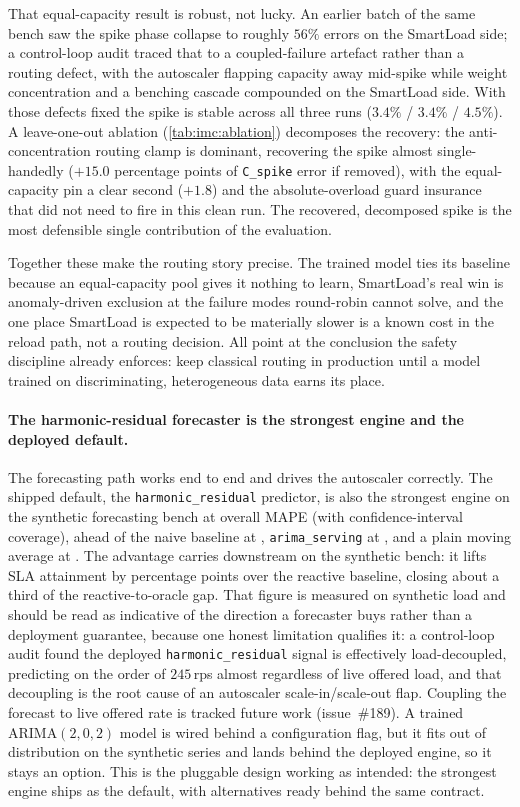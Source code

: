 That equal-capacity result is robust, not lucky. An earlier batch of the same bench saw
the spike phase collapse to roughly $56\%$ errors on the SmartLoad side; a control-loop
audit traced that to a coupled-failure artefact rather than a routing defect, with the
autoscaler flapping capacity away mid-spike while weight concentration and a benching
cascade compounded on the SmartLoad side. With those defects fixed the spike is stable
across all three runs ($3.4\%$ / $3.4\%$ / $4.5\%$). A leave-one-out ablation
(\cref{tab:imc:ablation}) decomposes the recovery: the anti-concentration routing clamp
is dominant, recovering the spike almost single-handedly ($+15.0$ percentage points of
\texttt{C\_spike} error if removed), with the equal-capacity pin a clear second
($+1.8$) and the absolute-overload guard insurance that did not need to fire in this
clean run. The recovered, decomposed spike is the most defensible single contribution of
the evaluation.

Together these make the routing story precise. The trained model ties its baseline
because an equal-capacity pool gives it nothing to learn, SmartLoad's real win is
anomaly-driven exclusion at the failure modes round-robin cannot solve, and the one
place SmartLoad is expected to be materially slower is a known cost in the reload path,
not a routing decision. All point at the conclusion the safety discipline already
enforces: keep classical routing in production until a model trained on discriminating,
heterogeneous data earns its place.

\paragraph{The harmonic-residual forecaster is the strongest engine and the deployed
default.} The forecasting path works end to end and drives the autoscaler correctly.
The shipped default, the \texttt{harmonic\_residual} predictor, is also the strongest
engine on the synthetic forecasting bench at \BMfcMape{} overall MAPE (with \BMfcCiCov{}
confidence-interval coverage), ahead of the naive baseline at \BMfcMapeNaive{},
\texttt{arima\_serving} at \BMfcMapeArima{}, and a plain moving average at \BMfcMapeMA{}.
The advantage carries downstream on the synthetic bench: it lifts SLA
attainment by \BMfcSlaGain{} percentage points over the reactive baseline, closing
about a third of the reactive-to-oracle gap. That figure is measured on synthetic load
and should be read as indicative of the direction a forecaster buys rather than a
deployment guarantee, because one honest limitation qualifies it: a control-loop audit
found the deployed \texttt{harmonic\_residual} signal is effectively load-decoupled,
predicting on the order of $245$\,rps almost regardless of live offered load, and that
decoupling is the root cause of an autoscaler scale-in/scale-out flap. Coupling the
forecast to live offered rate is tracked future work (issue~\#189). A trained
ARIMA$(2,0,2)$ model is wired behind a configuration flag,
but it fits out of distribution on the synthetic series and lands behind the deployed
engine, so it stays an option. This is the pluggable design working as intended: the
strongest engine ships as the default, with alternatives ready behind the same contract.

